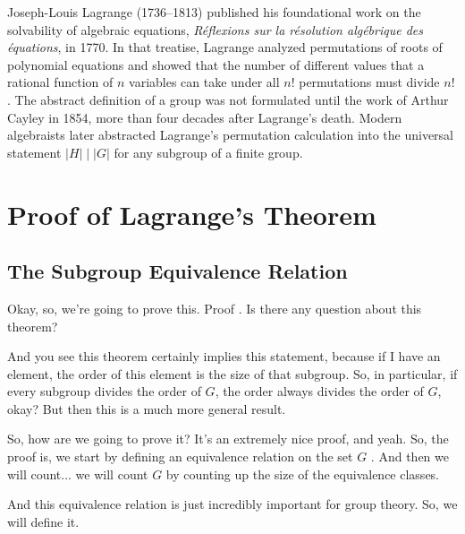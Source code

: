 \begin{aiNote}
Joseph-Louis Lagrange (1736--1813) published his foundational work on the solvability of algebraic equations, \emph{R{\'e}flexions sur la r{\'e}solution alg{\'e}brique des {\'e}quations}, in 1770. In that treatise, Lagrange analyzed permutations of roots of polynomial equations and showed that the number of different values that a rational function of $n$ variables can take under all $n!$ permutations must divide $n!$. The abstract definition of a group was not formulated until the work of Arthur Cayley in 1854, more than four decades after Lagrange's death. Modern algebraists later abstracted Lagrange's permutation calculation into the universal statement $|H| \mid |G|$ for any subgroup of a finite group.
\end{aiNote}

\section{Proof of Lagrange's Theorem}

\subsection{The Subgroup Equivalence Relation}

\begin{speech}[00:12:05 - 00:13:17]
Okay, so, we're going to prove this. Proof . Is there any question about this theorem?

And you see this theorem certainly implies this statement, because if I have an element, the order of this element is the size of that subgroup. So, in particular, if every subgroup divides the order of $G$, the order always divides the order of $G$, okay? But then this is a much more general result.

So, how are we going to prove it? It's an extremely nice proof, and yeah. So, the proof is, we start by defining an equivalence relation on the set $G$ . And then we will count... we will count $G$ by counting up the size of the equivalence classes.

And this equivalence relation is just incredibly important for group theory. So, we will define it.
\end{speech}

